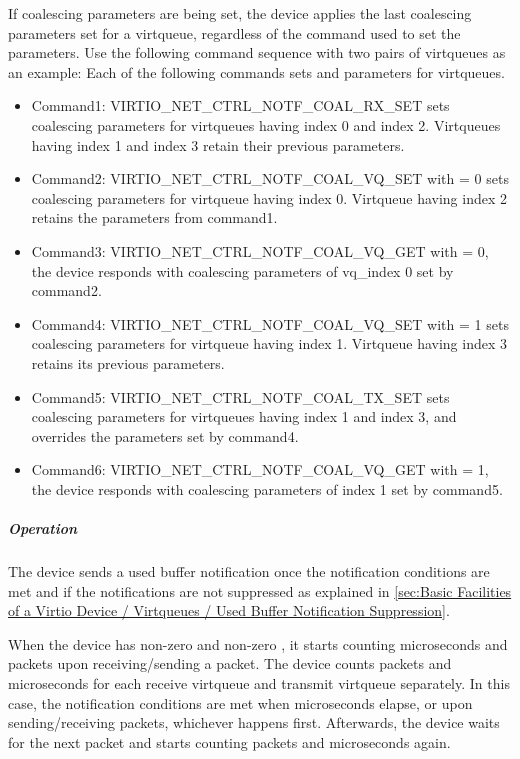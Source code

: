 If coalescing parameters are being set, the device applies the last coalescing parameters set for a
virtqueue, regardless of the command used to set the parameters. Use the following command sequence
with two pairs of virtqueues as an example:
Each of the following commands sets  and  parameters for virtqueues.
\begin{itemize}
\item Command1: VIRTIO_NET_CTRL_NOTF_COAL_RX_SET sets coalescing parameters for virtqueues having index 0 and index 2. Virtqueues having index 1 and index 3 retain their previous parameters.
\item Command2: VIRTIO_NET_CTRL_NOTF_COAL_VQ_SET with  = 0 sets coalescing parameters for virtqueue having index 0. Virtqueue having index 2 retains the parameters from command1.
\item Command3: VIRTIO_NET_CTRL_NOTF_COAL_VQ_GET with  = 0, the device responds with coalescing parameters of vq_index 0 set by command2.
\item Command4: VIRTIO_NET_CTRL_NOTF_COAL_VQ_SET with  = 1 sets coalescing parameters for virtqueue having index 1. Virtqueue having index 3 retains its previous parameters.
\item Command5: VIRTIO_NET_CTRL_NOTF_COAL_TX_SET sets coalescing parameters for virtqueues having index 1 and index 3, and overrides the parameters set by command4.
\item Command6: VIRTIO_NET_CTRL_NOTF_COAL_VQ_GET with  = 1, the device responds with coalescing parameters of index 1 set by command5.
\end{itemize}

\subparagraph{Operation}\label{sec:Device Types / Network Device / Device Operation / Control Virtqueue / Notifications Coalescing / Operation}

The device sends a used buffer notification once the notification conditions are met and if the notifications are not suppressed as explained in \ref{sec:Basic Facilities of a Virtio Device / Virtqueues / Used Buffer Notification Suppression}.

When the device has non-zero  and non-zero , it starts counting microseconds and packets upon receiving/sending a packet.
The device counts packets and microseconds for each receive virtqueue and transmit virtqueue separately.
In this case, the notification conditions are met when  microseconds elapse, or upon sending/receiving  packets, whichever happens first.
Afterwards, the device waits for the next packet and starts counting packets and microseconds again.

